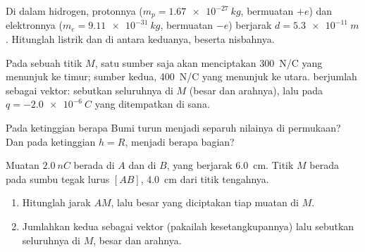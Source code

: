 \begin{exercise}[$\star\star$]\label{exo:g11:electric-gravitational-fields:10}
Di dalam  hidrogen, protonnya ($m_p = \qty{1.67e-27}{kg}$,
bermuatan $+e$) dan elektronnya ($m_e = \qty{9.11e-31}{kg}$, bermuatan
$-e$) berjarak $d = \qty{5.3e-11}{m}$. Hitunglah  listrik dan  di antara keduanya, beserta nisbahnya.
\end{exercise}

\begin{exercise}[$\star\star$]\label{exo:g11:electric-gravitational-fields:11}
Pada sebuah titik $M$, satu sumber saja akan menciptakan 
\qty{300}{N/C} yang menunjuk ke timur; sumber kedua, \qty{400}{N/C} yang
menunjuk ke utara.  berjumlah sebagai vektor: sebutkan 
seluruhnya di $M$ (besar dan arahnya), lalu  pada
$q = \qty{-2.0e-6}{C}$ yang ditempatkan di sana.
\end{exercise}

\begin{exercise}[$\star\star\star$]\label{exo:g11:electric-gravitational-fields:12}
Pada ketinggian berapa  Bumi turun menjadi separuh nilainya di
permukaan? Dan pada ketinggian $h = R$, menjadi berapa bagian?
\end{exercise}

\begin{exercise}[$\star\star\star$]\label{exo:g11:electric-gravitational-fields:13}
Muatan $\qty{+2.0}{nC}$ berada di $A$ dan di $B$, yang berjarak
\qty{6.0}{cm}. Titik $M$ berada pada sumbu tegak lurus $[AB]$,
\qty{4.0}{cm} dari titik tengahnya.
\begin{enumerate}
  \item Hitunglah jarak $AM$, lalu besar  yang diciptakan tiap
        muatan di $M$.
  \item Jumlahkan kedua  sebagai vektor (pakailah
        kesetangkupannya) lalu sebutkan  seluruhnya di $M$, besar
        dan arahnya.
\end{enumerate}
\end{exercise}

